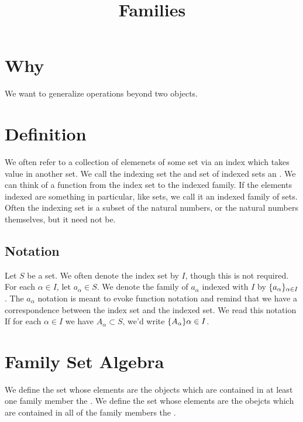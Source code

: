 






\title{Families}

\section{Why}

We want to generalize operations beyond two objects.

\section{Definition}

We often refer to a collection of elemenets of some set via an index which takes value in another set.
We call the indexing set the  and set of indexed sets an .
We can think of a function from the index set to the indexed family.
If the elements indexed are something in particular, like sets, we call it an indexed family of sets.
Often the indexing set is a subset of the natural numbers, or the natural numbers themselves, but it need not be.

\subsection{Notation}
Let $S$ be a set.
We often denote the index set by $I$, though this is not required.
For each $\alpha \in I$, let $a_{\alpha} \in S$.
We denote the family of $a_{\alpha}$ indexed with $I$ by $\{a_{\alpha}\}_{\alpha \in I}$.
The $a_{\alpha}$ notation is meant to evoke function notation and remind that we have a correspondence between the index set and the indexed set.
We read this notation 
If for each $\alpha \in I$ we have $A_{\alpha} \subset S$, we'd write $\{A_{\alpha}\}{\alpha \in I}$.

\section{Family Set Algebra}
We define the set whose elements are the objects which are contained in at least one family member the .
We define the set whose elements are the obejcts which are contained in all of the family members the .

